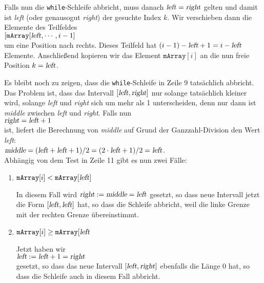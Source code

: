 Falls nun die \texttt{while}-Schleife abbricht, muss danach $\textsl{left} = \textsl{right}$ gelten
und damit ist \textsl{left} (oder genausogut \textsl{right}) der gesuchte Index $k$.  Wir verschieben
dann die Elemente des Teilfeldes 
\\[0.2cm]
\hspace*{1.3cm}
$[\mathtt{mArray}[\textsl{left}, \cdots, i-1]$ 
\\[0.2cm]
um eine Position
nach rechts.  Dieses Teilfeld hat $(i-1) - \textsl{left} + 1 = i - \textsl{left}$ Elemente.
Anschlie{\ss}end kopieren wir das Element $\texttt{mArray}[i]$ an die nun freie Position $k = \textsl{left}$.

Es bleibt noch zu zeigen, dass die \texttt{while}-Schleife in Zeile 9 tats\"achlich abbricht.
Das Problem ist, dass das Intervall $[\textsl{left}, \textsl{right}]$ nur solange tats\"achlich
kleiner wird, solange \textsl{left} und \textsl{right} sich um mehr als 1 unterscheiden, denn nur
dann ist \textsl{middle} zwischen \textsl{left} und \textsl{right}.  Falls nun
\\[0.2cm]
\hspace*{1.3cm}
$\textsl{right} = \textsl{left} + 1$
\\[0.2cm]
ist, liefert die Berechnung von \textsl{middle} auf Grund der Ganzzahl-Division den Wert \textsl{left}:
\\[0.2cm]
\hspace*{1.3cm}
$\textsl{middle} = (\textsl{left} + \textsl{left} + 1) / 2 = (2 \cdot\textsl{left} + 1) / 2 = \textsl{left}$.
\\[0.2cm]
Abh\"angig von dem Test in Zeile 11 gibt es nun zwei F\"alle:
\begin{enumerate}
\item $\mathtt{mArray}[i] < \mathtt{mArray}[\textsl{left}]$
  
      In diesem Fall wird $\textsl{right} := \textsl{middle} = \textsl{left}$ gesetzt,
      so dass neue Intervall jetzt die Form $[\textsl{left}, \textsl{left}]$ hat, so dass die
      Schleife abbricht, weil die linke Grenze mit der rechten Grenze \"ubereinstimmt.
\item $\mathtt{mArray}[i] \geq \mathtt{mArray}[\textsl{left}$

      Jetzt haben wir
      \\[0.2cm]
      \hspace*{1.3cm}
      $\textsl{left} := \textsl{left} + 1 = \textsl{right}$
      \\[0.2cm]
      gesetzt, so dass das neue Intervall  $[\textsl{left}, \textsl{right}]$ ebenfalls die L\"ange 0
      hat, so dass die Schleife auch in diesem Fall abbricht.
\end{enumerate}


